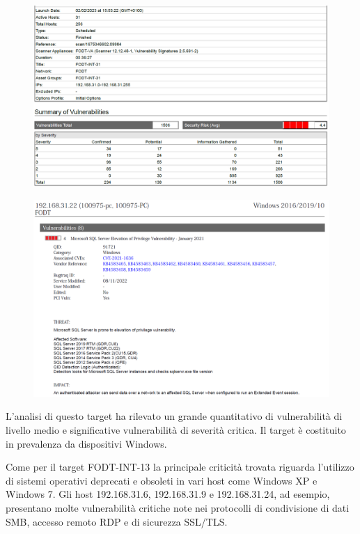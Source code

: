 \documentclass[target=bach,aauheader=]{thud}
\begin{document}
\begin{figure}[t]
    \centering
    \includegraphics[width=1\linewidth]{images/FODT-INT-31_1.png}
    \caption{}
    \label{fig:fodt-int-31_1}
\end{figure}

\begin{figure}[t]
    \centering
    \includegraphics[width=1\linewidth]{images/FODT-INT-31_2.png}
    \caption{}
    \label{fig:fodt-int-31_2}
\end{figure}


L’analisi di questo target ha rilevato un grande quantitativo di vulnerabilità di livello medio e significative vulnerabilità di severità critica. Il target è costituito in prevalenza da dispositivi Windows.

Come per il target FODT-INT-13 la principale criticità trovata riguarda l’utilizzo di sistemi operativi deprecati e obsoleti in vari host come Windows XP e Windows 7.
Gli host 192.168.31.6, 192.168.31.9 e 192.168.31.24, ad esempio, presentano molte vulnerabilità critiche note nei protocolli di condivisione di dati SMB, accesso remoto RDP e di sicurezza SSL/TLS.
\end{document}
